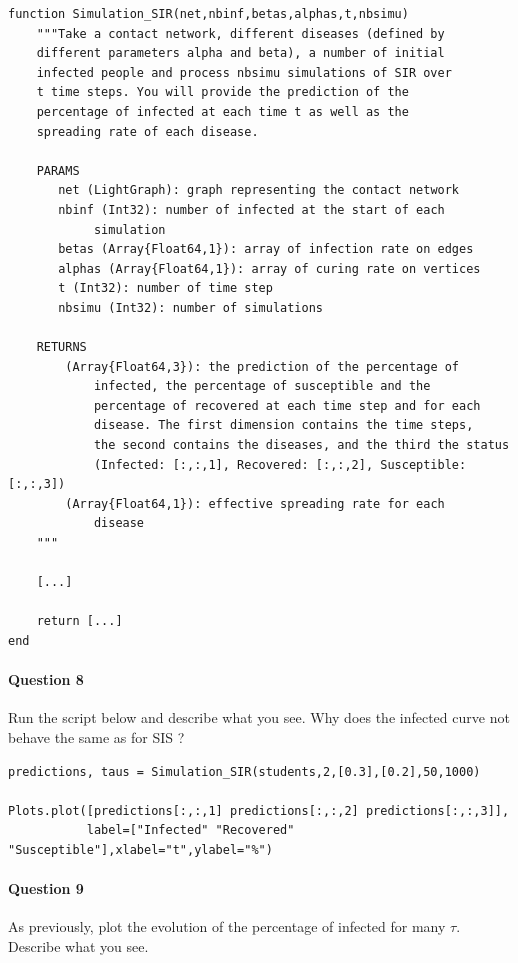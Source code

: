 \documentclass{article}
\begin{document}
\begin{verbatim}
function Simulation_SIR(net,nbinf,betas,alphas,t,nbsimu)
    """Take a contact network, different diseases (defined by 
    different parameters alpha and beta), a number of initial
    infected people and process nbsimu simulations of SIR over
    t time steps. You will provide the prediction of the 
    percentage of infected at each time t as well as the 
    spreading rate of each disease.
    
    PARAMS
       net (LightGraph): graph representing the contact network
       nbinf (Int32): number of infected at the start of each 
            simulation
       betas (Array{Float64,1}): array of infection rate on edges
       alphas (Array{Float64,1}): array of curing rate on vertices
       t (Int32): number of time step
       nbsimu (Int32): number of simulations
    
    RETURNS
        (Array{Float64,3}): the prediction of the percentage of 
            infected, the percentage of susceptible and the 
            percentage of recovered at each time step and for each 
            disease. The first dimension contains the time steps,
            the second contains the diseases, and the third the status
            (Infected: [:,:,1], Recovered: [:,:,2], Susceptible: [:,:,3])
        (Array{Float64,1}): effective spreading rate for each 
            disease
    """

    [...]

    return [...]
end
\end{verbatim}

\paragraph{Question 8} Run the script below and describe what you see. Why does the infected curve not behave the same as for SIS ?

\begin{verbatim}
predictions, taus = Simulation_SIR(students,2,[0.3],[0.2],50,1000)

Plots.plot([predictions[:,:,1] predictions[:,:,2] predictions[:,:,3]],
           label=["Infected" "Recovered" "Susceptible"],xlabel="t",ylabel="%")
\end{verbatim}

\paragraph{Question 9} As previously, plot the evolution of the percentage of infected for many $\tau$. Describe what you see.
\end{document}
